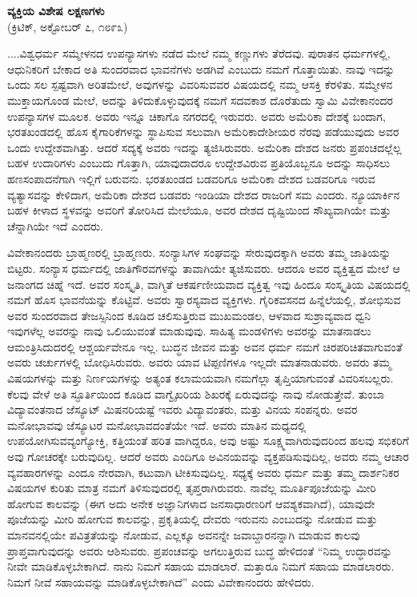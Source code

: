 \delimiter

\begin{center}
\textbf{ವ್ಯಕ್ತಿಯ ವಿಶೇಷ ಲಕ್ಷಣಗಳು}\\ (ಕ್ರಿಟಿಕ್​, ಅಕ್ಟೋಬರ್​ ೭, ೧೮೯೩)
\end{center}

....ವಿಶ್ವಧರ್ಮ ಸಮ್ಮೇಳನದ ಉಪನ್ಯಾಸಗಳು ನಡೆದ ಮೇಲೆ ನಮ್ಮ ಕಣ್ಣುಗಳು ತೆರೆದವು. ಪುರಾತನ ಧರ್ಮಗಳಲ್ಲಿ, ಆಧುನಿಕರಿಗೆ ಬೇಕಾದ ಅತಿ ಸುಂದರವಾದ ಭಾವನೆಗಳು ಅಡಗಿವೆ ಎಂಬುದು ನಮಗೆ ಗೊತ್ತಾಯಿತು. ನಾವು ಇದನ್ನು ಒಂದು ಸಲ ಸ್ಪಷ್ಟವಾಗಿ ಅರಿತಮೇಲೆ, ಅವುಗಳನ್ನು ವಿವರಿಸುವವರ ವಿಷಯದಲ್ಲಿ ನಮ್ಮ ಆಸಕ್ತಿ ಕೆರಳಿತು. ಸಮ್ಮೇಳನ ಮುಕ್ತಾಯಗೊಂಡ ಮೇಲೆ, ಅದನ್ನು ತಿಳಿದುಕೊಳ್ಳುವುದಕ್ಕೆ ನಮಗೆ ಸದವಕಾಶ ದೊರೆತುದು ಸ್ವಾಮಿ ವಿವೇಕಾನಂದರ ಉಪನ್ಯಾಸಗಳ ಮೂಲಕ. ಅವರು ಇನ್ನೂ ಚಿಕಾಗೊ ನಗರದಲ್ಲಿ ಇರುವರು. ಅವರು ಅಮೆರಿಕಾ ದೇಶಕ್ಕೆ ಬಂದಾಗ, ಭರತಖಂಡದಲ್ಲಿ ಹೊಸ ಕೈಗಾರಿಕೆಗಳನ್ನು ಸ್ಥಾಪಿಸುವ ಸಲುವಾಗಿ ಅಮೆರಿಕಾದೇಶೀಯರ ನೆರವು ಪಡೆಯುವುದು ಅವರ ಒಂದು ಉದ್ದೇಶವಾಗಿತ್ತು. ಆದರೆ ಸದ್ಯಕ್ಕೆ ಅವರು ಇದನ್ನು ತ್ಯಜಿಸಿರುವರು. ಅಮೆರಿಕಾ ದೇಶದ ಜನರು ಪ್ರಪಂಚದಲ್ಲೆಲ್ಲ ಬಹಳ ಉದಾರಿಗಳು ಎಂಬುದು ಗೊತ್ತಾಗಿ, ಯಾವುದಾದರೂ ಉದ್ದೇಶವಿರುವ ಪ್ರತಿಯೊಬ್ಬನೂ ಅದನ್ನು ಸಾಧಿಸಲು ಹಣಸಂಪಾದನೆಗಾಗಿ ಇಲ್ಲಿಗೆ ಬರುವನು. ಭರತಖಂಡದ ಬಡವರಿಗೂ ಅಮೆರಿಕಾ ದೇಶದ ಬಡವರಿಗೂ ಇರುವ ವ್ಯತ್ಯಾಸವನ್ನು ಕೇಳಿದಾಗ, ಅಮೆರಿಕಾ ದೇಶದ ಬಡವರು ಇಂಡಿಯಾ ದೇಶದ ರಾಜರಿಗೆ ಸಮ ಎಂದರು. ನ್ಯೂಯಾರ್ಕಿನ ಬಹಳ ಕೀಳಾದ ಸ್ಥಳವನ್ನು ಅವರಿಗೆ ತೋರಿಸಿದ ಮೇಲೆಯೂ, ಅವರ ದೇಶದ ದೃಷ್ಟಿಯಿಂದ ಸೌಖ್ಯವಾಗಿಯೇ ಮತ್ತು ಚೆನ್ನಾಗಿಯೇ ಇದೆ ಎಂದರು.

ವಿವೇಕಾನಂದರು ಬ್ರಾಹ್ಮಣರಲ್ಲಿ ಬ್ರಾಹ್ಮಣರು. ಸಂನ್ಯಾಸಿಗಳ ಸಂಘವನ್ನು ಸೇರು\break ವುದಕ್ಕಾಗಿ ಅವರು ತಮ್ಮ ಜಾತಿಯನ್ನು ಬಿಟ್ಟರು. ಸಂನ್ಯಾಸ ಧರ್ಮದಲ್ಲಿ ಜಾತಿಗೌರವಗಳನ್ನು ತಾವಾಗಿಯೇ ತ್ಯಜಿಸುವರು. ಆದರೂ ಅವರ ವ್ಯಕ್ತಿತ್ವದ ಮೇಲೆ ಆ ಜನಾಂಗದ ಚಿಹ್ನೆ ಇದೆ. ಅವರ ಸಂಸ್ಕೃತಿ, ವಾಗ್ಮಿತೆ ಆಕರ್ಷಣೀಯವಾದ ವ್ಯಕ್ತಿತ್ವ ಇವು ಹಿಂದೂ ಸಂಸ್ಕೃತಿಯ ವಿಷಯದಲ್ಲಿ ನಮಗೆ ಹೊಸ ಭಾವನೆಯನ್ನು ಕೊಟ್ಟಿವೆ. ಅವರು ಸ್ವಾರಸ್ಯವಾದ ವ್ಯಕ್ತಿಗಳು. ಗೈರಿಕವಸನದ ಹಿನ್ನೆಲೆಯಲ್ಲಿ, ಶೋಭಿಸುವ ಅವರ ಸುಂದರವಾದ ತೇಜಸ್ಸಿನಿಂದ ಕೂಡಿದ ಚಲಿಸುತ್ತಿರುವ ಮುಖಮಂಡಲ, ಆಳವಾದ ಸುಶ್ರಾವ್ಯವಾದ ಧ್ವನಿ ಇವುಗಳೆಲ್ಲ ಅವರನ್ನು ನಾವು ಒಲಿಯುವಂತೆ ಮಾಡುವುವು. ಸಾಹಿತ್ಯ ಮಂಡಳಿಗಳು ಅವರನ್ನು ಮಾತನಾಡಲು ಆಮಂತ್ರಿಸಿದುದರಲ್ಲಿ ಆಶ್ಚರ್ಯವೇನೂ ಇಲ್ಲ. ಬುದ್ಧನ ಜೀವನ ಮತ್ತು ಅವನ ಧರ್ಮ ನಮಗೆ ಚಿರಪರಿಚಿತವಾಗುವಂತೆ ಅವರು ಚರ್ಚುಗಳಲ್ಲಿ ಬೋಧಿಸಿರುವರು. ಅವರು ಯಾವ ಟಿಪ್ಪಣಿಗಳೂ ಇಲ್ಲದೇ ಮಾತನಾಡುವರು. ಅವರು ತಮ್ಮ ವಿಷಯಗಳನ್ನು ಮತ್ತು ನಿರ್ಣಯಗಳನ್ನು ಅತ್ಯಂತ ಕಲಾಮಯವಾಗಿ ನಮಗೆಲ್ಲಾ ತೃಪ್ತಿಯಾಗುವಂತೆ ವಿವರಿಸಬಲ್ಲರು. ಕೆಲವು ವೇಳೆ ಅತಿ ಸ್ಫೂರ್ತಿಯಿಂದ ಕೂಡಿದ ವಾಗ್ವೈಖರಿಯ ಶಿಖರಕ್ಕೆ ಏರುವುದನ್ನು ನಾವು ನೋಡುತ್ತೇವೆ. ತುಂಬಾ ವಿದ್ಯಾವಂತನಾದ ಜೆಸ್ಯೂಟ್​ ಮಿಷನರಿಯಷ್ಟೆ ಇವರು ವಿದ್ಯಾವಂತರು, ಮತ್ತು ವಿನಯ ಸಂಪನ್ನರು. ಅವರ ಮನೋಭಾವವು ಜೆಸ್ಯೂಟರ ಮನೋಭಾವದಂತೆಯೇ ಇದೆ. ಅವರು ಮಾತಿನ ಮಧ್ಯದಲ್ಲಿ ಉಪಯೋಗಿಸುವ\break ವ್ಯಂಗ್ಯೋಕ್ತಿ, ಕತ್ತಿಯಂತೆ ಹರಿತ ವಾಗಿದ್ದರೂ, ಅವು ಅಷ್ಟು ಸೂಕ್ಷ್ಮವಾಗಿರುವುದರಿಂದ ಹಲವು ಸಭಿಕರಿಗೆ ಅವು ಗೋಚರಕ್ಕೇ ಬರುವುದಿಲ್ಲ. ಆದರೆ ಅವರು ಎಂದಿಗೂ ಅವಿನಯ\break ವನ್ನು ವ್ಯಕ್ತಪಡಿಸುವುದಿಲ್ಲ, ಅವರು ನಮ್ಮ ಆಚಾರ ವ್ಯವಹಾರಗಳನ್ನು ಎಂದೂ ನೇರವಾಗಿ, ಕಟುವಾಗಿ ಟೀಕಿಸುವುದಿಲ್ಲ. ಸಧ್ಯಕ್ಕೆ ಅವರು ಧರ್ಮ ಮತ್ತು ತಮ್ಮ ದಾರ್ಶನಿಕರ ವಿಷಯಗಳ ಕುರಿತು ಮಾತ್ರ ನಮಗೆ ತಿಳಿಸುವುದರಲ್ಲಿ ತೃಪ್ತರಾಗಿರುವರು. ನಾವೆಲ್ಲ ಮೂರ್ತಿಪೂಜೆಯನ್ನು ಮೀರಿ ಹೋಗುವ ಕಾಲವನ್ನು (ಈಗ ಅದು ಅನೇಕ ಅಜ್ಞಾನಿಗಳಾದ ಜನಸಾಧಾರಣರಿಗೆ ಆವಶ್ಯಕವಾಗಿದೆ), ಯಾವುದೇ ಪೂಜೆಯನ್ನು ಮೀರಿ ಹೋಗುವ ಕಾಲವನ್ನು, ಪ್ರಕೃತಿಯಲ್ಲಿ ದೇವರು ಇರುವನು ಎಂಬುದನ್ನು ನೋಡುವ ಮತ್ತು ಮಾನವ\break ನಲ್ಲಿಯೇ ಪವಿತ್ರತೆಯನ್ನು ನೋಡುವ, ಎಲ್ಲಕ್ಕೂ ಅವನನ್ನೇ ಜವಾಬ್ದಾರನನ್ನಾಗಿ ಮಾಡುವ ಕಾಲವು ಪ್ರಾಪ್ತವಾಗುವುದನ್ನು ಅವರು ಆಶಿಸುವರು. ಪ್ರಪಂಚವನ್ನು ಅಗಲುತ್ತಿರುವ ಬುದ್ಧ ಹೇಳಿದಂತೆ “ನಿಮ್ಮ ಉದ್ಧಾರವನ್ನು ನೀವೇ ಮಾಡಿಕೊಳ್ಳಬೇಕಾಗಿದೆ. ನಾನು ನಿಮಗೆ ಸಹಾಯ ಮಾಡಲಾರೆ. ಮತ್ತಾರೂ ನಿಮಗೆ ಸಹಾಯ ಮಾಡಲಾರರು. ನಿಮಗೆ ನೀವೆ ಸಹಾಯವನ್ನು ಮಾಡಿಕೊಳ್ಳಬೇಕಾಗಿದೆ” ಎಂದು ವಿವೇಕಾನಂದರು ಹೇಳಿದರು.

